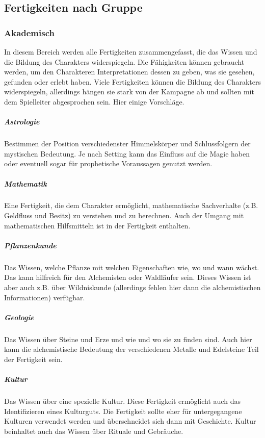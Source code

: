 \documentclass{article}
\begin{document}
\begin{center}
\subsection{Fertigkeiten nach Gruppe}
\end{center}

\subsubsection{Akademisch}

In diesem Bereich werden alle Fertigkeiten zusammengefasst, die das Wissen und die Bildung des Charakters widerspiegeln.
Die Fähigkeiten können gebraucht werden, um den Charakteren Interpretationen dessen zu geben, was sie gesehen, gefunden
oder erlebt haben. Viele Fertigkeiten können die Bildung des Charakters widerspiegeln, allerdings hängen sie stark
von der Kampagne ab und sollten mit dem Spielleiter abgesprochen sein. Hier einige Vorschläge.

\subparagraph{Astrologie}

Bestimmen der Position verschiedenster Himmelskörper und Schlussfolgern der mystischen Bedeutung. Je nach Setting
kann das Einfluss auf die Magie haben oder eventuell sogar für prophetische Voraussagen genutzt werden.

\subparagraph{Mathematik}

Eine Fertigkeit, die dem Charakter ermöglicht, mathematische Sachverhalte (z.B. Geldfluss und Besitz) zu verstehen und
zu berechnen. Auch der Umgang mit mathematischen Hilfsmitteln ist in der Fertigkeit enthalten.

\subparagraph{Pflanzenkunde}

Das Wissen, welche Pflanze mit welchen Eigenschaften wie, wo und wann wächst. Das kann hilfreich für den Alchemisten oder
Waldläufer sein. Dieses Wissen ist aber auch z.B. über Wildniskunde (allerdings fehlen hier dann die
alchemistischen Informationen) verfügbar.

\subparagraph{Geologie}

Das Wissen über Steine und Erze und wie und wo sie zu finden sind. Auch hier kann die alchemistische Bedeutung der
verschiedenen Metalle und Edelsteine Teil der Fertigkeit sein.

\subparagraph{Kultur}

Das Wissen über eine spezielle Kultur. Diese Fertigkeit ermöglicht auch das Identifizieren eines Kulturguts. Die
Fertigkeit sollte eher für untergegangene Kulturen verwendet werden und überschneidet sich dann mit Geschichte. Kultur
beinhaltet auch das Wissen über Rituale und Gebräuche.
\end{document}
